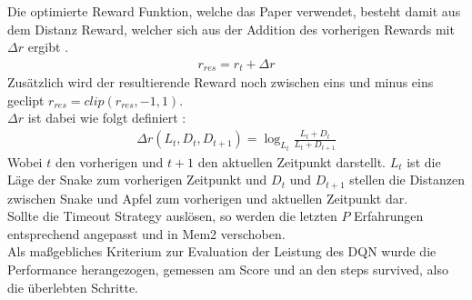 Die optimierte Reward Funktion, welche das Paper verwendet, besteht damit aus dem Distanz Reward, welcher sich aus der Addition des vorherigen Rewards mit $\Delta r$ ergibt .
\begin{align}
	r_{res} = r_t + \Delta r
	\label{eq:Verwandte_Arbeiten_r}
\end{align}
Zusätzlich wird der resultierende Reward noch zwischen eins und minus eins geclipt $r_{res} = clip (r_{res}, -1, 1)$.\\
$\Delta r$ ist dabei wie folgt definiert :
\begin{align}
	\Delta r(L_t, D_t,D_{t+1}) = \log_{L_t}\frac{L_t + D_t}{L_t + D_{t + 1}}
	\label{eq:Verwandte_Arbeiten_Delta_r}
\end{align}
Wobei $t$ den vorherigen und $t+1$ den aktuellen Zeitpunkt darstellt. $L_t$ ist die Läge der Snake zum vorherigen Zeitpunkt und $D_t$ und $D_{t+1}$ stellen die Distanzen zwischen Snake und Apfel zum vorherigen und aktuellen Zeitpunkt dar.\\
Sollte die Timeout Strategy auslösen, so werden die letzten $P$ Erfahrungen entsprechend angepasst und in Mem2 verschoben.\\
Als maßgebliches Kriterium zur Evaluation der Leistung des DQN wurde die Performance herangezogen, gemessen am Score und an den steps survived, also die überlebten Schritte.

